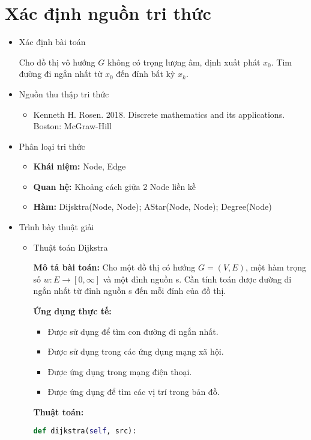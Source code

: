 \section{Xác định nguồn tri thức} 

\begin{itemize}
	\item Xác định bài toán
	
	Cho đồ thị vô hướng $G$ không có trọng lượng âm, định xuất phát $x_0$. Tìm đường đi ngắn nhất từ $x_0$ đến đỉnh bất kỳ $x_k$.
	
	\item Nguồn thu thập tri thức
	\begin{itemize}
		\item Kenneth H. Rosen. 2018. Discrete mathematics and its applications. Boston: McGraw-Hill
	\end{itemize}
	
	\item Phân loại tri thức
	\begin{itemize}
		\item \textbf{Khái niệm: } Node, Edge
		\item \textbf{Quan hệ: } Khoảng cách giữa 2 Node liền kề
		\item \textbf{Hàm: } Dijsktra(Node, Node); AStar(Node, Node); Degree(Node)
	\end{itemize}
	\item Trình bày thuật giải
	\begin{itemize}
		\item Thuật toán Dijkstra
		
		\textbf{Mô tả bài toán:} Cho một đồ thị có hướng $G=(V,E)$, một hàm trọng số $w: E \rightarrow [0,\infty]$ và một đỉnh nguồn s. Cần tính toán được đường đi ngắn nhất từ đỉnh nguồn s đến mỗi đỉnh của đồ thị.
		
		\textbf{Ứng dụng thực tế:}
		\begin{itemize}
			\item Được sử dụng để tìm con đường đi ngắn nhất.
			\item Được sử dụng trong các ứng dụng mạng xã hội.
			\item Được ứng dụng trong mạng điện thoại.
			\item Được ứng dụng để tìm các vị trí trong bản đồ.
		\end{itemize}
	
	
		\textbf{Thuật toán:}
		\begin{lstlisting}[language=Python, caption=Mã giải của thuật toán Dijkstra]
			def dijkstra(self, src):
			

\end{lstlisting}
\end{itemize}
\end{itemize}
